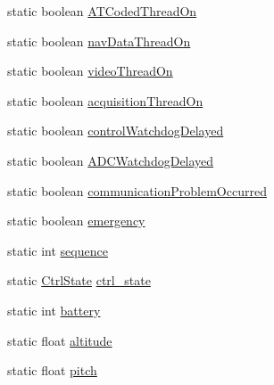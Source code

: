\begin{DoxyCompactItemize}
\item 
static boolean \hyperlink{classworkspace_1_1_a_r_drone_nav_data_1_1src_1_1controller_1_1_drone_test_a0dd789b3b30fefdbe5a98ce7078ef822}{A\+T\+Coded\+Thread\+On}
\item 
static boolean \hyperlink{classworkspace_1_1_a_r_drone_nav_data_1_1src_1_1controller_1_1_drone_test_a218707ca6ccb2bfe2edab072679165c4}{nav\+Data\+Thread\+On}
\item 
static boolean \hyperlink{classworkspace_1_1_a_r_drone_nav_data_1_1src_1_1controller_1_1_drone_test_a576edd308264ecf530e1d800aa8cee1a}{video\+Thread\+On}
\item 
static boolean \hyperlink{classworkspace_1_1_a_r_drone_nav_data_1_1src_1_1controller_1_1_drone_test_a77ddfb59b86b320bb2e73d62d01dd199}{acquisition\+Thread\+On}
\item 
static boolean \hyperlink{classworkspace_1_1_a_r_drone_nav_data_1_1src_1_1controller_1_1_drone_test_a3fc085b3e7c6a774c3404f5713dfe893}{control\+Watchdog\+Delayed}
\item 
static boolean \hyperlink{classworkspace_1_1_a_r_drone_nav_data_1_1src_1_1controller_1_1_drone_test_a13e0b2f6a87745cf4852539f93d1ec84}{A\+D\+C\+Watchdog\+Delayed}
\item 
static boolean \hyperlink{classworkspace_1_1_a_r_drone_nav_data_1_1src_1_1controller_1_1_drone_test_ad6c952a7cd89d9d2ba82b57ca7fd1b5a}{communication\+Problem\+Occurred}
\item 
static boolean \hyperlink{classworkspace_1_1_a_r_drone_nav_data_1_1src_1_1controller_1_1_drone_test_a084d6d4f72d64051b2b5433c17e4fbbb}{emergency}
\item 
static int \hyperlink{classworkspace_1_1_a_r_drone_nav_data_1_1src_1_1controller_1_1_drone_test_af2d00cb6ad7c1629ef89c5c9847a1c99}{sequence}
\item 
static \hyperlink{enumworkspace_1_1_a_r_drone_nav_data_1_1src_1_1controller_1_1_ctrl_state}{Ctrl\+State} \hyperlink{classworkspace_1_1_a_r_drone_nav_data_1_1src_1_1controller_1_1_drone_test_aed0680aaf48f5df307af86a50472dbe8}{ctrl\+\_\+state}
\item 
static int \hyperlink{classworkspace_1_1_a_r_drone_nav_data_1_1src_1_1controller_1_1_drone_test_a5c1afa51b8a7209525be502cbcbb2717}{battery}
\item 
static float \hyperlink{classworkspace_1_1_a_r_drone_nav_data_1_1src_1_1controller_1_1_drone_test_a96af0aa5257780f2230c98811fb0f8ba}{altitude}
\item 
static float \hyperlink{classworkspace_1_1_a_r_drone_nav_data_1_1src_1_1controller_1_1_drone_test_a5267867dd0cbed3adb619ea898ac0ea1}{pitch}

\end{DoxyCompactItemize}
